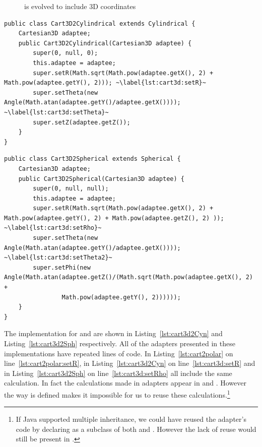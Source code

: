 \documentclass{llncs}
\begin{document}
\begin{figure}[h]
\centering

\caption{ is evolved to include 3D coordinates}%
\label{fig:evolved}%
\end{figure}


\begin{lstlisting}[float, caption={Adapter for converting three dimensional cartesian coordinates to Cylindrical coordinates}, label={lst:cart3d2Cyn}]
public class Cart3D2Cylindrical extends Cylindrical {
	Cartesian3D adaptee;
	public Cart3D2Cylindrical(Cartesian3D adaptee) {
		super(0, null, 0);
		this.adaptee = adaptee;
		super.setR(Math.sqrt(Math.pow(adaptee.getX(), 2) + Math.pow(adaptee.getY(), 2))); ~\label{lst:cart3d:setR}~
		super.setTheta(new Angle(Math.atan(adaptee.getY()/adaptee.getX()))); ~\label{lst:cart3d:setTheta}~
		super.setZ(adaptee.getZ());
	}
}
\end{lstlisting}
\begin{lstlisting}[float, caption={Adapter for converting three dimensional cartesian coordinates to Spherical coordinates}, label={lst:cart3d2Sph}]
public class Cart3D2Spherical extends Spherical {
	Cartesian3D adaptee;
	public Cart3D2Spherical(Cartesian3D adaptee) {
		super(0, null, null);
		this.adaptee = adaptee;
		super.setR(Math.sqrt(Math.pow(adaptee.getX(), 2) + Math.pow(adaptee.getY(), 2) + Math.pow(adaptee.getZ(), 2) )); ~\label{lst:cart3d:setRho}~
		super.setTheta(new Angle(Math.atan(adaptee.getY()/adaptee.getX()))); ~\label{lst:cart3d:setTheta2}~
		super.setPhi(new Angle(Math.atan(adaptee.getZ()/(Math.sqrt(Math.pow(adaptee.getX(), 2) +
				Math.pow(adaptee.getY(), 2))))));
	}
}
\end{lstlisting}

 
The implementation for  and  are shown in Listing~\ref{lst:cart3d2Cyn} and Listing~\ref{lst:cart3d2Sph} respectively. All of the adapters presented in these implementations have repeated lines of code. In Listing~\ref{lst:cart2polar} on line~\ref{lst:cart2polar:setR}, in Listing~\ref{lst:cart3d2Cyn} on line~\ref{lst:cart3d:setR} and in Listing~\ref{lst:cart3d2Sph} on line~\ref{lst:cart3d:setRho} all include the same calculation. In fact the calculations made in  adapters appear in  and . However the way  is defined makes it impossible for us to reuse these calculations.\footnote{If Java supported multiple inheritance, we could have reused the  adapter's code by declaring  as a subclass of both  and . However the lack of reuse would still be present in .} 
\end{document}
